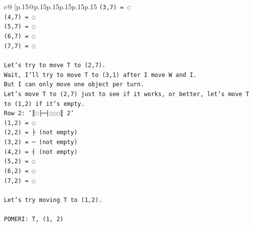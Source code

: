 \documentclass{article}
\begin{document}
{\begin{supertabular}{c@{$\;$}|p{.15\linewidth}@{}p{.15\linewidth}p{.15\linewidth}p{.15\linewidth}p{.15\linewidth}p{.15\linewidth}}
{{{\texttt{(3,7) = ◌} \\
\texttt{(4,7) = ◌} \\
\texttt{(5,7) = ◌} \\
\texttt{(6,7) = ◌} \\
\texttt{(7,7) = ◌} \\
\\ 
\texttt{Let's try to move T to (2,7).} \\
\texttt{Wait, I'll try to move T to (3,1) after I move W and I.} \\
\texttt{But I can only move one object per turn.} \\
\texttt{Let's move T to (2,7) just to see if it works, or better, let's move T to (1,2) if it's empty.} \\
\texttt{Row 2: `║◌├─┤◌◌◌║ 2`} \\
\texttt{(1,2) = ◌} \\
\texttt{(2,2) = ├ (not empty)} \\
\texttt{(3,2) = ─ (not empty)} \\
\texttt{(4,2) = ┤ (not empty)} \\
\texttt{(5,2) = ◌} \\
\texttt{(6,2) = ◌} \\
\texttt{(7,2) = ◌} \\
\\ 
\texttt{Let's try moving T to (1,2).} \\
\\ 
\texttt{POMERI: T, (1, 2)} \\
            }
        }
    }
     \\ \\


\end{supertabular}}
\end{document}
